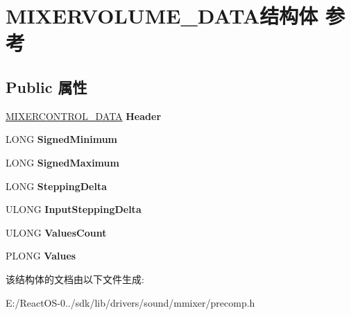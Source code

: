 \hypertarget{struct_m_i_x_e_r_v_o_l_u_m_e___d_a_t_a}{}\section{M\+I\+X\+E\+R\+V\+O\+L\+U\+M\+E\+\_\+\+D\+A\+T\+A结构体 参考}
\label{struct_m_i_x_e_r_v_o_l_u_m_e___d_a_t_a}
\subsection*{Public 属性}
\begin{DoxyCompactItemize}
\item 
\mbox{\label{struct_m_i_x_e_r_v_o_l_u_m_e___d_a_t_a_a51c231e7fbd3aafd16d4a07e03863235}} 
\hyperlink{struct_m_i_x_e_r_c_o_n_t_r_o_l___d_a_t_a}{M\+I\+X\+E\+R\+C\+O\+N\+T\+R\+O\+L\+\_\+\+D\+A\+TA} {\bfseries Header}
\item 
\mbox{\label{struct_m_i_x_e_r_v_o_l_u_m_e___d_a_t_a_a527737b6fad90bb6bcfaab7bcd76ebb9}} 
L\+O\+NG {\bfseries Signed\+Minimum}
\item 
\mbox{\label{struct_m_i_x_e_r_v_o_l_u_m_e___d_a_t_a_ad67919ef129b442a5f4f26f901346b0a}} 
L\+O\+NG {\bfseries Signed\+Maximum}
\item 
\mbox{\label{struct_m_i_x_e_r_v_o_l_u_m_e___d_a_t_a_af5327870caae561c4607060e27cb9d2f}} 
L\+O\+NG {\bfseries Stepping\+Delta}
\item 
\mbox{\label{struct_m_i_x_e_r_v_o_l_u_m_e___d_a_t_a_a83f349f7509cddf49cf5b1d038a86a37}} 
U\+L\+O\+NG {\bfseries Input\+Stepping\+Delta}
\item 
\mbox{\label{struct_m_i_x_e_r_v_o_l_u_m_e___d_a_t_a_a8329fe81b15f261fa8aa2bb99be5b4e1}} 
U\+L\+O\+NG {\bfseries Values\+Count}
\item 
\mbox{\label{struct_m_i_x_e_r_v_o_l_u_m_e___d_a_t_a_a8aa1ce73617417928980a42ba72f2d05}} 
P\+L\+O\+NG {\bfseries Values}
\end{DoxyCompactItemize}


该结构体的文档由以下文件生成\+:\begin{DoxyCompactItemize}
\item 
E\+:/\+React\+O\+S-\/0../sdk/lib/drivers/sound/mmixer/precomp.\+h\end{DoxyCompactItemize}
